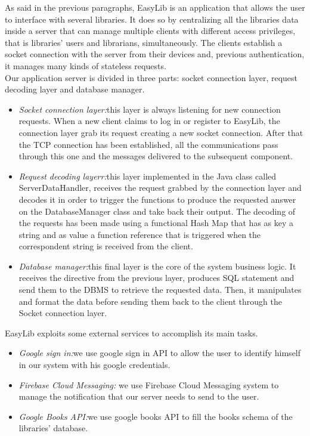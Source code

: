 As said in the previous paragraphs, EasyLib is an application that allows the user to interface with several libraries. It does so by centralizing all the libraries data inside a server that can manage multiple clients with different access privileges, that is libraries’ users and librarians, simultaneously. The clients establish a socket connection with the server from their devices and, previous authentication, it manages many kinds of stateless requests. \\
Our application server is divided in three parts: socket connection layer, request decoding layer and database manager.

\begin{itemize}
\item \emph{Socket connection layer:}this layer is always listening for new connection requests. When a new client claims to log in or register to EasyLib, the connection layer grab its request creating a new socket connection. After that the TCP connection has been established, all the communications pass through this one and the messages delivered to the subsequent component.
\item \emph{Request decoding layerr:}this layer implemented in the Java class called ServerDataHandler, receives the request grabbed by the connection layer and decodes it in order to trigger the functions to produce the requested answer on the DatabaseManager class and take back their output. The decoding of the requests has been made using a functional Hash Map that has as key a string and as value a function reference that is triggered when the correspondent string is received from the client.
\item \emph{Database manager:}this final layer is the core of the system business logic. It receives the directive from the previous layer, produces SQL statement and send them to the DBMS to retrieve the requested data. Then, it manipulates and format the data before sending them back to the client through the Socket connection layer.
\end{itemize}


EasyLib exploits some external services to accomplish its main tasks.

\begin{itemize}
\item \emph{Google sign in:}we use google sign in API to allow the user to identify himself in our system with his google credentials.
\item \emph{Firebase Cloud Messaging: } we use Firebase Cloud Messaging system to manage the notification that our server needs to send to the user.
\item \emph{Google Books API:}we use google books API to fill the books schema of the libraries’ database.
\end{itemize}

